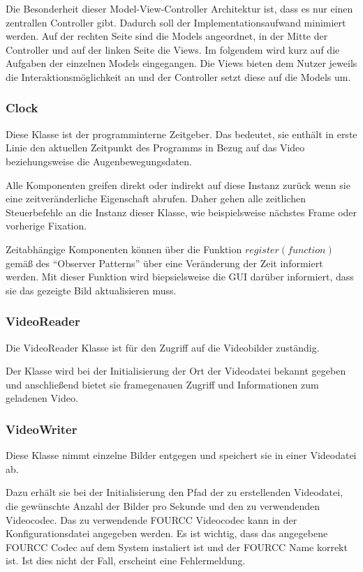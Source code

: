 \documentclass[a4paper,draft]{scrartcl}
\begin{document}
  Die Besonderheit dieser Model-View-Controller Architektur ist, dass es nur einen zentrallen Controller gibt. Dadurch soll der Implementationsaufwand minimiert werden. Auf der rechten Seite sind die Models angeordnet, in der Mitte der Controller und auf der linken Seite die Views. Im folgendem wird kurz auf die Aufgaben der einzelnen Models eingegangen. Die Views bieten dem Nutzer jeweils die Interaktionsmöglichkeit an und der Controller setzt diese auf die Models um.

\subsubsection{Clock}
Diese Klasse ist der programminterne Zeitgeber. 
Das bedeutet, sie enthält in erste Linie den aktuellen Zeitpunkt des Programms in Bezug auf das Video beziehungsweise die Augenbewegungsdaten.

Alle Komponenten greifen direkt oder indirekt auf diese Instanz zurück wenn sie eine zeitveränderliche Eigenschaft abrufen. Daher gehen alle zeitlichen Steuerbefehle an die Instanz dieser Klasse, wie beispielsweise nächstes Frame oder vorherige Fixation. 

Zeitabhängige Komponenten können über die Funktion $register(function)$ gemäß des "`Observer Patterns"' über eine Veränderung der Zeit informiert werden.
Mit dieser Funktion wird biepsielsweise die GUI darüber informiert, dass sie das gezeigte Bild aktualisieren muss.

\subsubsection{VideoReader}
Die VideoReader Klasse ist für den Zugriff auf die Videobilder zuständig.

Der Klasse wird bei der Initialisierung der Ort der Videodatei bekannt gegeben und anschließend bietet sie framegenauen Zugriff und Informationen zum geladenen Video.

\subsubsection{VideoWriter}
Diese Klasse nimmt einzelne Bilder entgegen und speichert sie in einer Videodatei ab.

Dazu erhält sie bei der Initialisierung den Pfad der zu erstellenden Videodatei, die gewünschte Anzahl der Bilder pro Sekunde und den zu verwendenden Videocodec.
Das zu verwendende FOURCC Videocodec kann in der Konfigurationsdatei angegeben werden. Es ist wichtig, dass das angegebene FOURCC Codec auf dem System instaliert ist und der FOURCC Name korrekt ist. Ist dies nicht der Fall, erscheint eine Fehlermeldung.
\end{document}

